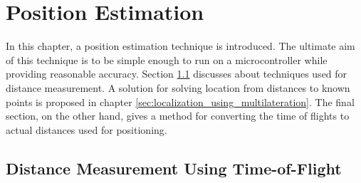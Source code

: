\documentclass[\main/main.tex]{subfiles}
\begin{document}
\graphicspath{{img/}{position_estimation/img/}}
\chapter{Position Estimation}

In this chapter, a position estimation technique is introduced. The ultimate aim of this technique is to be simple enough to run on a microcontroller while providing reasonable accuracy. Section \ref{sec:distance_measurement_using_time_of_flight} discusses about techniques used for distance measurement. A solution for solving location from distances to known points is proposed in chapter \ref{sec:localization_using_multilateration}. The final section, on the other hand, gives a method for converting the time of flights to actual distances used for positioning.

\section{Distance Measurement Using Time-of-Flight}
\label{sec:distance_measurement_using_time_of_flight}
\end{document}

